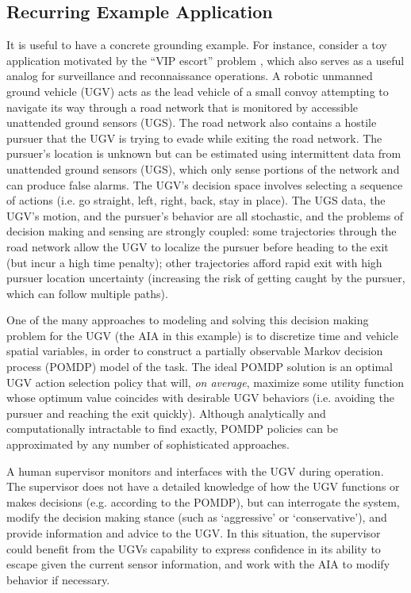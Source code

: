 \subsection{Recurring Example Application}
    It is useful to have a concrete grounding example. For instance, consider a toy application motivated by the ``VIP escort'' problem \cite{Humphrey2012-lr}, which also serves as a useful analog for surveillance and reconnaissance operations. 
    A robotic unmanned ground vehicle (UGV) acts as the lead vehicle of a small convoy attempting to navigate its way through a road network that is monitored by accessible unattended ground sensors (UGS). The road network also contains a hostile pursuer that the UGV is trying to evade while exiting the road network. The pursuer's location is unknown but can be estimated using intermittent data from unattended ground sensors (UGS), which only sense portions of the network and can produce false alarms. The UGV's decision space involves selecting a sequence of actions (i.e. go straight, left, right, back, stay in place). The UGS data, the UGV's motion, and the pursuer's behavior are all stochastic, and the problems of decision making and sensing are strongly coupled: some trajectories through the road network allow the UGV to localize the pursuer before heading to the exit (but incur a high time penalty); other trajectories afford rapid exit with high pursuer location uncertainty (increasing the risk of getting caught by the pursuer, which can follow multiple paths). 

    One of the many approaches to modeling and solving this decision making problem for the UGV (the AIA in this example) is to discretize time and vehicle spatial variables, in order to construct a partially observable Markov decision process (POMDP) model of the task. The ideal POMDP solution is an optimal UGV action selection policy that will, \emph{on average}, maximize some utility function whose optimum value coincides with desirable UGV behaviors (i.e. avoiding the pursuer and reaching the exit quickly). Although analytically and computationally intractable to find exactly, POMDP policies can be approximated by any number of sophisticated approaches.

    A human supervisor monitors and interfaces with the UGV during operation. The supervisor does not have a detailed knowledge of how the UGV functions or makes decisions (e.g. according to the POMDP), but can interrogate the system, modify the decision making stance (such as `aggressive' or `conservative'), and provide information and advice to the UGV. In this situation, the supervisor could benefit from the UGVs capability to express confidence in its ability to escape given the current sensor information, and work with the AIA to modify behavior if necessary. 
    
